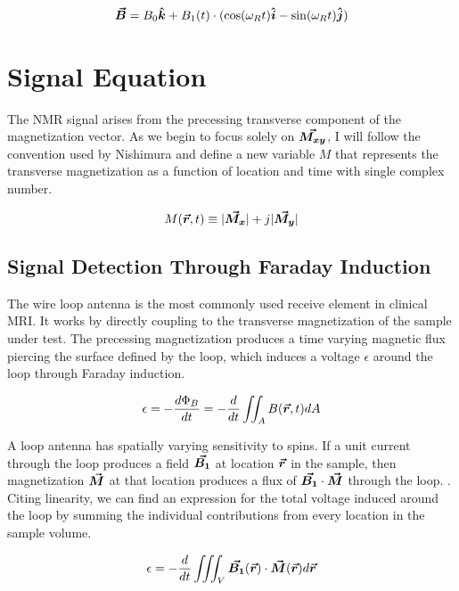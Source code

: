 \begin{equation}\label{eq:B_rot}
    \bm{\vec{B}} = B_0 \bm{\hat{k}} + B_1(t) \cdot (\cos(\omega_R t) \bm{\hat{i}} - \sin(\omega_R t)\bm{\hat{j}})
\end{equation}

\section{Signal Equation}

The NMR signal arises from the precessing transverse component of the magnetization vector. As we begin to focus solely
on $\bm{\vec{M_{xy}}}$, I will follow the convention used by Nishimura \cite{nishimura} and define a new variable $M$ that
represents the transverse magnetization as a function of location and time with single complex number.

\begin{equation}\label{eq:M_complex}
    M(\bm{\vec{r}},t) \equiv |\bm{\vec{M_x}}| + j |\bm{\vec{M_y}}|
\end{equation}

\subsection{Signal Detection Through Faraday Induction}

The wire loop antenna is the most commonly used receive element in clinical MRI. It works by directly coupling to the
transverse magnetization of the sample under test. The precessing magnetization produces a time varying magnetic flux
piercing the surface defined by the loop, which induces a voltage $\epsilon$ around the loop through Faraday induction.

\begin{equation}\label{eq:faraday_induction}
    \epsilon = - \frac{d \Phi_B}{dt} = -\frac{d}{dt} \iint_A B(\bm{\vec{r}},t) dA
\end{equation}

A loop antenna has spatially varying sensitivity to spins.  If a unit current through the loop produces a field
$\bm{\vec{B_1}}$ at location $\bm{\vec{r}}$ in the sample, then magnetization $\bm{\vec{M}}$ at that location produces a flux of
$\bm{\vec{B_1}} \cdot \bm{\vec{M}}$ through the loop.  \cite{Hoult1979}. Citing linearity, we can find an expression for the
total voltage induced around the loop by summing the individual contributions from every location in the sample volume.

\begin{equation}\label{eq:reciprocity}
    \epsilon = -\frac{d}{dt} \iiint_V \bm{\vec{B_1}}(\bm{\vec{r}}) \cdot \bm{\vec{M}}(\bm{\vec{r}}) d\bm{\vec{r}}
\end{equation}

